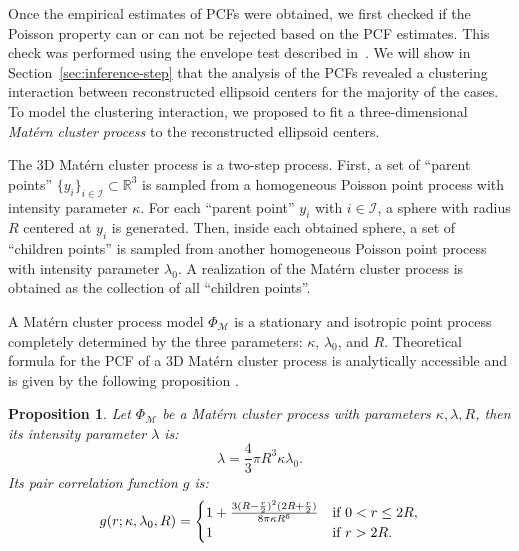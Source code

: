 \documentclass[journal]{IEEEtran}
\newtheorem{prop}{Proposition}[section]%
\begin{document}
Once the empirical estimates of PCFs were obtained, we first checked
if the Poisson property can or can not be rejected based on the PCF
estimates. This check was performed using the envelope test described
in~\cite{baddeley2014tests}. We will show in
Section~\ref{sec:inference-step} that the analysis of the PCFs
revealed a clustering interaction between reconstructed ellipsoid
centers for the majority of the cases. To model the clustering
interaction, we proposed to fit a three-dimensional \textit{Mat\'ern
  cluster process} \cite{baddeley2007spatial} to the reconstructed
ellipsoid centers.

The 3D Mat\'ern cluster process is a two-step process. First, a set of
``parent points'' $\{ y_i \}_{i \in \mathcal{I}} \subset \mathbb{R}^3$
is sampled from a homogeneous Poisson point process with intensity
parameter $\kappa$. For each ``parent point'' $y_i$ with
$i \in \mathcal{I}$, a sphere with radius $R$ centered at $y_i$ is
generated. Then, inside each obtained sphere, a set of ``children
points'' is sampled from another homogeneous Poisson point process
with intensity parameter $\lambda_0$. A realization of the Mat\'ern
cluster process is obtained as the collection of all ``children
points''.

A Mat\'ern cluster process model $\Phi_\mathcal{M}$ is a stationary
and isotropic point process completely determined by the three
parameters: $\kappa$, $\lambda_0$, and $R$. Theoretical formula for
the PCF of a 3D Mat\'ern cluster process is analytically accessible
and is given by the following proposition
\cite[p376]{illian2008statistical}.

\begin{prop}
  Let $\Phi_{\mathcal{M}}$ be a Mat\'ern cluster process with
  parameters $\kappa, \lambda, R$, then its intensity parameter
  $\lambda$ is:
  \begin{equation}
    \label{eq:matern-inten}
    \lambda = \frac{4}{3}\pi R^3\kappa \lambda_0.
  \end{equation}
  Its pair correlation function $g$ is:
  \begin{equation}
    \label{eq:matern-pcf}
    g(r; \kappa, \lambda_0, R) =
    \begin{cases}
      1 + \frac{3(R - \frac{r}{2})^2 (2R + \frac{r}{2})} {8\pi \kappa
        R^6}
      & \textnormal{if } 0 < r \leq 2R, \\
      1 & \textnormal{if } r > 2R. \\
    \end{cases}
  \end{equation}
\end{prop}
\end{document}

